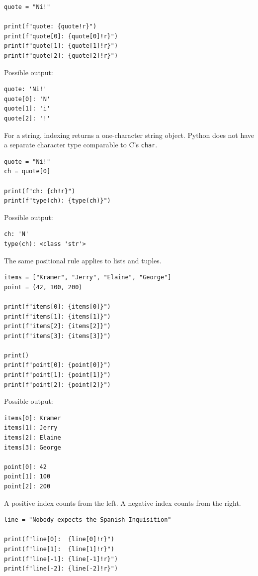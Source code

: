 \begin{verbatim}
quote = "Ni!"

print(f"quote: {quote!r}")
print(f"quote[0]: {quote[0]!r}")
print(f"quote[1]: {quote[1]!r}")
print(f"quote[2]: {quote[2]!r}")
\end{verbatim}

Possible output:

\begin{verbatim}
quote: 'Ni!'
quote[0]: 'N'
quote[1]: 'i'
quote[2]: '!'
\end{verbatim}

For a string, indexing returns a one-character string object. Python does not have a separate character type comparable to C's \texttt{char}.

\begin{verbatim}
quote = "Ni!"
ch = quote[0]

print(f"ch: {ch!r}")
print(f"type(ch): {type(ch)}")
\end{verbatim}

Possible output:

\begin{verbatim}
ch: 'N'
type(ch): <class 'str'>
\end{verbatim}

The same positional rule applies to lists and tuples.

\begin{verbatim}
items = ["Kramer", "Jerry", "Elaine", "George"]
point = (42, 100, 200)

print(f"items[0]: {items[0]}")
print(f"items[1]: {items[1]}")
print(f"items[2]: {items[2]}")
print(f"items[3]: {items[3]}")

print()
print(f"point[0]: {point[0]}")
print(f"point[1]: {point[1]}")
print(f"point[2]: {point[2]}")
\end{verbatim}

Possible output:

\begin{verbatim}
items[0]: Kramer
items[1]: Jerry
items[2]: Elaine
items[3]: George

point[0]: 42
point[1]: 100
point[2]: 200
\end{verbatim}

A positive index counts from the left. A negative index counts from the right.

\begin{verbatim}
line = "Nobody expects the Spanish Inquisition"

print(f"line[0]:  {line[0]!r}")
print(f"line[1]:  {line[1]!r}")
print(f"line[-1]: {line[-1]!r}")
print(f"line[-2]: {line[-2]!r}")
\end{verbatim}

